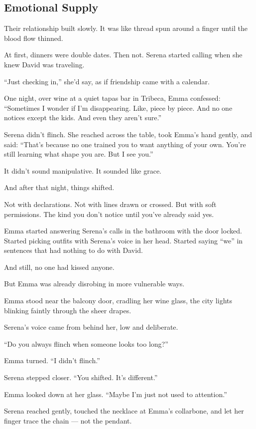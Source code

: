 
\subsection{Emotional Supply}

Their relationship built slowly. It was like thread spun around a finger until the blood flow thinned.

At first, dinners were double dates. Then not. Serena started calling when she knew David 
was traveling.

``Just checking in,'' she'd say, as if friendship came with a calendar.

One night, over wine at a quiet tapas bar in Tribeca, Emma confessed:
``Sometimes I wonder if I’m disappearing. Like, piece by piece. And no one notices except the kids. 
And even they aren’t sure.''

Serena didn’t flinch. She reached across the table, took Emma’s hand gently, and said:
``That’s because no one trained you to want anything of your own. You’re still learning what 
shape you are. But I see you.''

It didn’t sound manipulative.
It sounded like grace.

And after that night, things shifted.

Not with declarations. Not with lines drawn or crossed.
But with soft permissions. The kind you don’t notice until you’ve already said yes.

Emma started answering Serena’s calls in the bathroom with the door locked.
Started picking outfits with Serena’s voice in her head.
Started saying “we” in sentences that had nothing to do with David.

And still, no one had kissed anyone.

But Emma was already disrobing in more vulnerable ways.

Emma stood near the balcony door, cradling her wine glass, the city lights blinking faintly 
through the sheer drapes.

Serena’s voice came from behind her, low and deliberate.

“Do you always flinch when someone looks too long?”

Emma turned. “I didn’t flinch.”

Serena stepped closer. “You shifted. It’s different.”

Emma looked down at her glass. “Maybe I’m just not used to attention.”

Serena reached gently, touched the necklace at Emma’s collarbone, and let her finger trace the 
chain — not the pendant.

